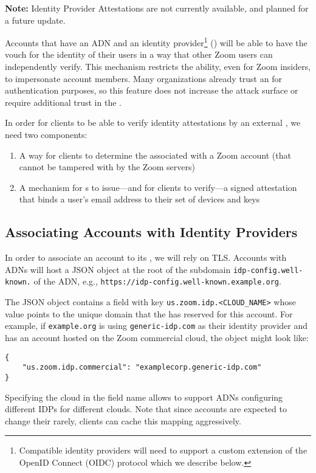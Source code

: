\textbf{Note:} Identity Provider Attestations are not currently available, and planned for a future
update.

Accounts that have an ADN and an identity provider\footnote{Compatible identity providers will need
to support a custom extension of the OpenID Connect (OIDC) protocol which we describe below.} (\idp)
will be able to have the \idp vouch for the identity of their users in a way that other Zoom users
can independently verify. This mechanism restricts the ability, even for Zoom insiders, to
impersonate account members. Many organizations already trust an \idp for authentication purposes,
so this feature does not increase the attack surface or require additional trust in the \idp.

In order for clients to be able to verify identity attestations by an external \idp, we need two
components:

\begin{enumerate}
\item A way for clients to determine the \idp associated with a Zoom account (that cannot be
    tampered with by the Zoom servers)
\item A mechanism for {\idp}s to issue---and for clients to verify---a signed attestation that binds
    a user's email address to their set of devices and keys
\end{enumerate}

\subsection{Associating Accounts with Identity Providers}
\label{subsec:adnToIdp}
In order to associate an account to its \idp, we will rely on TLS\@. Accounts with ADNs will host a
JSON object at the root of the subdomain \texttt{idp-config.well-known.} of the ADN, e.g.,
\texttt{https://idp-config.well-known.example.org}.

The JSON object contains a field with key \texttt{us.zoom.idp.<CLOUD\_NAME>} whose value points to
the unique domain that the \idp has reserved for this account. For example, if \texttt{example.org}
is using \texttt{generic-idp.com} as their identity provider and has an account hosted on the Zoom
commercial cloud, the object might look like:

\begin{Verbatim}
{
    "us.zoom.idp.commercial": "examplecorp.generic-idp.com"
}
\end{Verbatim}

Specifying the cloud in the field name allows to support ADNs configuring different IDPs for
different clouds. Note that since accounts are expected to change their \idp rarely, clients can
cache this mapping aggressively.

